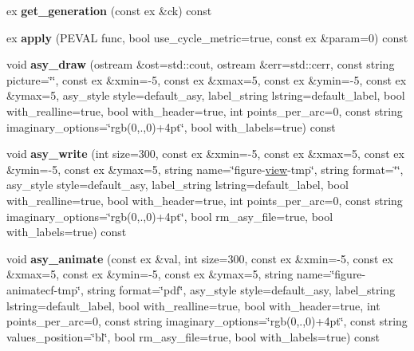 \begin{DoxyCompactItemize}
\item 
\mbox{\label{class_moeb_inv_1_1figure_a17c3d1598318d1eacfbd2e7380b970d0}} 
ex {\bfseries get\+\_\+generation} (const ex \&ck) const
\item 
\mbox{\label{class_moeb_inv_1_1figure_af47df5474587449058e599dd89fab073}} 
ex {\bfseries apply} (P\+E\+V\+AL func, bool use\+\_\+cycle\+\_\+metric=true, const ex \&param=0) const
\item 
\mbox{\label{class_moeb_inv_1_1figure_a49cd358c9efc24bdfdf07388e71959ad}} 
void {\bfseries asy\+\_\+draw} (ostream \&ost=std\+::cout, ostream \&err=std\+::cerr, const string picture=\char`\"{}\char`\"{}, const ex \&xmin=-\/5, const ex \&xmax=5, const ex \&ymin=-\/5, const ex \&ymax=5, asy\+\_\+style style=default\+\_\+asy, label\+\_\+string lstring=default\+\_\+label, bool with\+\_\+realline=true, bool with\+\_\+header=true, int points\+\_\+per\+\_\+arc=0, const string imaginary\+\_\+options=\char`\"{}rgb(0,.,0)+4pt\char`\"{}, bool with\+\_\+labels=true) const
\item 
\mbox{\label{class_moeb_inv_1_1figure_a6fcc62ff2ef2b854c45cebfe466dd883}} 
void {\bfseries asy\+\_\+write} (int size=300, const ex \&xmin=-\/5, const ex \&xmax=5, const ex \&ymin=-\/5, const ex \&ymax=5, string name=\char`\"{}figure-\/\mbox{\hyperlink{classview}{view}}-\/tmp\char`\"{}, string format=\char`\"{}\char`\"{}, asy\+\_\+style style=default\+\_\+asy, label\+\_\+string lstring=default\+\_\+label, bool with\+\_\+realline=true, bool with\+\_\+header=true, int points\+\_\+per\+\_\+arc=0, const string imaginary\+\_\+options=\char`\"{}rgb(0,.,0)+4pt\char`\"{}, bool rm\+\_\+asy\+\_\+file=true, bool with\+\_\+labels=true) const
\item 
\mbox{\label{class_moeb_inv_1_1figure_a95db99defd205929ff60c4d235c44ef2}} 
void {\bfseries asy\+\_\+animate} (const ex \&val, int size=300, const ex \&xmin=-\/5, const ex \&xmax=5, const ex \&ymin=-\/5, const ex \&ymax=5, string name=\char`\"{}figure-\/animatecf-\/tmp\char`\"{}, string format=\char`\"{}pdf\char`\"{}, asy\+\_\+style style=default\+\_\+asy, label\+\_\+string lstring=default\+\_\+label, bool with\+\_\+realline=true, bool with\+\_\+header=true, int points\+\_\+per\+\_\+arc=0, const string imaginary\+\_\+options=\char`\"{}rgb(0,.,0)+4pt\char`\"{}, const string values\+\_\+position=\char`\"{}bl\char`\"{}, bool rm\+\_\+asy\+\_\+file=true, bool with\+\_\+labels=true) const

\end{DoxyCompactItemize}
